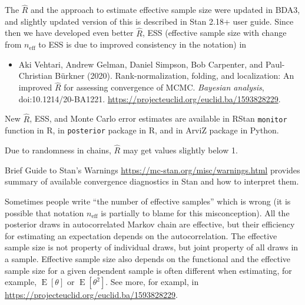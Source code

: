 \documentclass[a4paper,11pt,english]{article}
\DeclareMathOperator{\E}{E}
\def\eff{\mathrm{eff}}
\begin{document}
The $\widehat{R}$ and the approach to estimate effective sample size were
updated in BDA3, and slightly updated version of this is described in
Stan 2.18+ user guide. Since then we have developed even better
$\widehat{R}$, ESS (effective sample size with change from
$n_\eff$ to ESS is due to improved consistency in the notation) in
 \begin{itemize}
 \item Aki Vehtari, Andrew Gelman, Daniel Simpson, Bob Carpenter, and
   Paul-Christian Bürkner (2020). Rank-normalization, folding, and
   localization: An improved $\widehat{R}$ for assessing convergence of
   MCMC.  {\em Bayesian analysis}, doi:10.1214/20-BA1221. \url{https://projecteuclid.org/euclid.ba/1593828229}.
 \end{itemize}
 New $\widehat{R}$, ESS, and Monte Carlo error estimates are available in
 RStan {\tt monitor} function in R, in {\tt posterior} package in R,
 and in ArviZ package in Python.
 
Due to randomness in chains, $\widehat{R}$ may get values slightly below 1.

Brief Guide to Stan's Warnings
\url{https://mc-stan.org/misc/warnings.html} provides summary of
available convergence diagnostics in Stan and how to interpret them.

Sometimes people write ``the number of effective samples'' which is wrong (it is possible that notation $n_\eff$ is partially to blame for this misconception). All the posterior draws in autocorrelated Markov chain are effective, but their efficiency for estimating an expectation depends on the autocorrelation. The effective sample size is not property of individual draws, but joint property of all draws in a sample. Effective sample size also depends on the functional and the effective sample size for a given dependent sample is often different when estimating, for example, $\E[\theta]$ or $\E[\theta^2]$. See more, for exampl, in \url{https://projecteuclid.org/euclid.ba/1593828229}.
\end{document}
